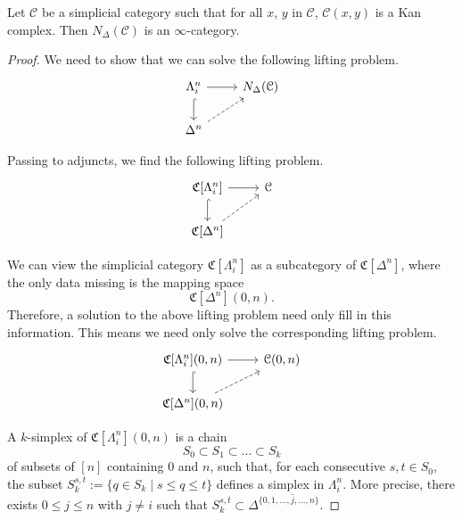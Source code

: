 \begin{proposition}
	\label{prop:simplicial_nerve_of_category_enriched_in_kan_complexes_gives_infinity_category}
	Let $\mathcal{C}$ be a simplicial category such that for all $x$, $y$ in $\mathcal{C}$, $\mathcal{C}(x, y)$ is a Kan complex. Then $N_{\Delta}( \mathcal{C} )$ is an $\infty$-category.
\end{proposition}
\begin{proof}
	We need to show that we can solve the following lifting problem.
	\begin{equation*}
	\begin{tikzcd}
	\Lambda^{n}_{i}
	\arrow[r]
	\arrow[d, hookrightarrow]
	& N_{\Delta}(\mathcal{C})
	\\
	\Delta^{n}
	\arrow[ur, dashed]
	\end{tikzcd}
	\end{equation*}
	
	Passing to adjuncts, we find the following lifting problem.
	\begin{equation*}
	\begin{tikzcd}
	\mathfrak{C}[\Lambda^{n}_{i}]
	\arrow[r]
	\arrow[d, hookrightarrow]
	& \mathcal{C}
	\\
	\mathfrak{C}[\Delta^{n}]
	\arrow[ur, dashed]
	\end{tikzcd}
	\end{equation*}
	
	We can view the simplicial category $\mathfrak{C}[\Lambda^{n}_{i}]$ as a subcategory of $\mathfrak{C}[\Delta^{n}]$, where the only data missing is the mapping space
	\begin{equation*}
	\mathfrak{C}[\Delta^{n}](0, n).
	\end{equation*}
	Therefore, a solution to the above lifting problem need only fill in this information. This means we need only solve the corresponding lifting problem.
	\begin{equation*}
	\begin{tikzcd}
	\mathfrak{C}[\Lambda^{n}_{i}](0, n)
	\arrow[r]
	\arrow[d, hookrightarrow]
	& \mathcal{C}(0, n)
	\\
	\mathfrak{C}[\Delta^{n}](0, n)
	\arrow[ur, dashed]
	\end{tikzcd}
	\end{equation*}
	
	A $k$-simplex of $\mathfrak{C}[\Lambda^{n}_{i}](0, n)$ is a chain 
	\[
	S_0\subset S_1\subset\ldots\subset S_k
	\]
	of subsets of $[n]$ containing $0$ and $n$, such that, for each consecutive $s,t\in S_0$, the subset $S_k^{s,t}:=\{q\in S_k\mid s\leq q \leq t\}$ defines a simplex in $\Lambda^n_i$. More precise, there exists $0\leq j \leq n$ with $j\neq i$ such that $S_k^{s,t}\subset \Delta^{\{0,1,\ldots,\hat{j},\ldots ,n\}}$. 
	

\end{proof}
